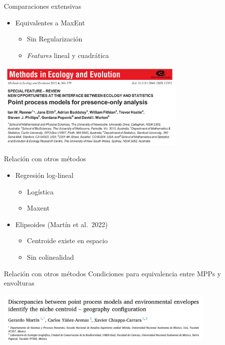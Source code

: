 \documentclass[
  11pt,
  ignorenonframetext,
]{beamer}
\providecommand{\tightlist}{%
  \setlength{\itemsep}{0pt}\setlength{\parskip}{0pt}}
\begin{document}
\begin{frame}{Comparaciones extensivas}
\protect\hypertarget{comparaciones-extensivas}{}
\begin{itemize}
\item
  Equivalentes a MaxEnt

  \begin{itemize}
  \tightlist
  \item
    Sin Regularización
  \item
    \emph{Features} lineal y cuadrática
  \end{itemize}
\end{itemize}

\includegraphics[width=3.69in]{Figuras/Renner}
\end{frame}

\begin{frame}{Relación con otros métodos}
\protect\hypertarget{relaciuxf3n-con-otros-muxe9todos}{}
\begin{itemize}
\item
  Regresión log-lineal

  \begin{itemize}
  \tightlist
  \item
    Logística
  \item
    Maxent
  \end{itemize}
\item
  Elipsoides (Martín et al.~2022)

  \begin{itemize}
  \tightlist
  \item
    Centroide existe en espacio
  \item
    Sin colinealidad
  \end{itemize}
\end{itemize}
\end{frame}

\begin{frame}{Relación con otros métodos}
\protect\hypertarget{relaciuxf3n-con-otros-muxe9todos-1}{}
Condiciones para equivalencia entre MPPs y envolturas

\includegraphics[width=4.26in]{Figuras/Discrep}
\end{frame}
\end{document}
